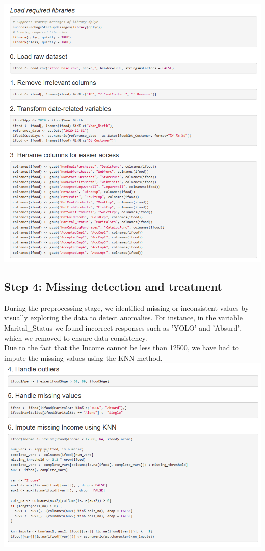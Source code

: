 \includegraphics[width=\textwidth]{Imatges/pre1.png}

\subsection{Step 4: Missing detection and treatment}
During the preprocessing stage, we identified missing or inconsistent values by visually exploring the data to detect anomalies. For instance, in the variable Marital\_Status we found incorrect responses such as 'YOLO' and 'Absurd', which we removed to ensure data consistency.\\

Due to the fact that the Income cannot be less than 12500, we have had to impute the missing values using the KNN method.\\

\includegraphics[width=\textwidth]{Imatges/pre2.png}
